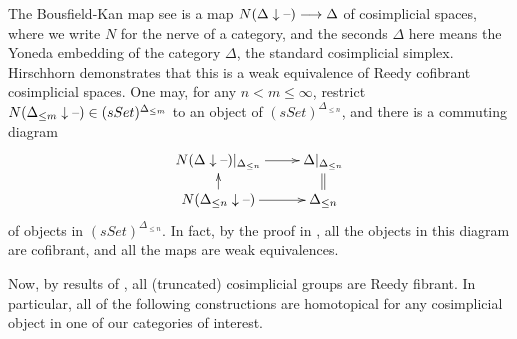 \documentclass[10pt]{article}
\renewcommand{\Set}{Set}
\newcommand{\TruncSimplex}[1]{{\Delta_{\leq#1}}}
\begin{document}
\begin{convergence}
The Bousfield-Kan map see \cite{Hirschhorn.pdf} is a map $N(\Delta\downarrow\textup{--})\longrightarrow \Delta$ of cosimplicial spaces, where we write $N$ for the nerve of a category, and the seconds $\Delta$ here means the Yoneda embedding of the category $\Delta$, the standard cosimplicial simplex. Hirschhorn demonstrates that this is a weak equivalence of Reedy cofibrant cosimplicial spaces. One may, for any $n< m\leq\infty$, restrict $N(\TruncSimplex{m}\downarrow\DASH) \in(s\Set)^{\TruncSimplex{m}}$ to an object of $(s\Set)^\TruncSimplex{n}$, and there is a commuting diagram
\[\xymatrix@R=4mm{
N(\Delta\downarrow\DASH)|_{\TruncSimplex{n}}
\ar[r]
&%
\Delta|_{\TruncSimplex{n}}
\ar@{=}[d]\\%
N(\TruncSimplex{n}\downarrow\DASH)\ar[u]
\ar[r]
&%
\TruncSimplex{n}%
}\]
of objects in $(s\Set)^{\TruncSimplex{n}}$. In fact, by the proof in \cite{Hirschhorn.pdf}, all the objects in this diagram are cofibrant, and all the maps are weak equivalences.

Now, by results of \cite[{X.4.9}]{YellowMonster}, all (truncated) cosimplicial groups are Reedy fibrant. In particular, all of the following constructions are homotopical for any cosimplicial object in one of our categories of interest.


\end{convergence}
\end{document}
